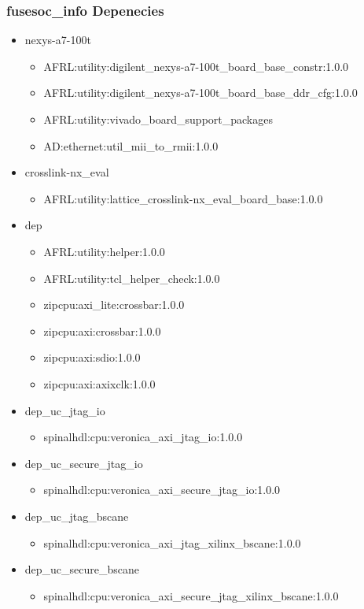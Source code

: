 \subsubsection{fusesoc\_info Depenecies}
\begin{itemize}
\item nexys-a7-100t
	\begin{itemize}
	\item AFRL:utility:digilent\_nexys-a7-100t\_board\_base\_constr:1.0.0
	\item AFRL:utility:digilent\_nexys-a7-100t\_board\_base\_ddr\_cfg:1.0.0
	\item AFRL:utility:vivado\_board\_support\_packages
	\item AD:ethernet:util\_mii\_to\_rmii:1.0.0
	\end{itemize}
\item crosslink-nx\_eval
	\begin{itemize}
	\item AFRL:utility:lattice\_crosslink-nx\_eval\_board\_base:1.0.0
	\end{itemize}
\item dep
	\begin{itemize}
	\item AFRL:utility:helper:1.0.0
	\item AFRL:utility:tcl\_helper\_check:1.0.0
	\item zipcpu:axi\_lite:crossbar:1.0.0
	\item zipcpu:axi:crossbar:1.0.0
	\item zipcpu:axi:sdio:1.0.0
	\item zipcpu:axi:axixclk:1.0.0
	\end{itemize}
\item dep\_uc\_jtag\_io
	\begin{itemize}
	\item spinalhdl:cpu:veronica\_axi\_jtag\_io:1.0.0
	\end{itemize}
\item dep\_uc\_secure\_jtag\_io
	\begin{itemize}
	\item spinalhdl:cpu:veronica\_axi\_secure\_jtag\_io:1.0.0
	\end{itemize}
\item dep\_uc\_jtag\_bscane
	\begin{itemize}
	\item spinalhdl:cpu:veronica\_axi\_jtag\_xilinx\_bscane:1.0.0
	\end{itemize}
\item dep\_uc\_secure\_bscane
	\begin{itemize}
	\item spinalhdl:cpu:veronica\_axi\_secure\_jtag\_xilinx\_bscane:1.0.0
	\end{itemize}
\end{itemize}
